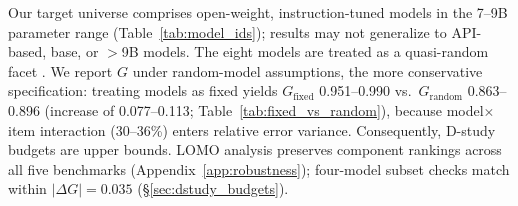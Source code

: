 Our target universe comprises open-weight, instruction-tuned models in the 7--9B parameter range (Table~\ref{tab:model_ids}); results may not generalize to API-based, base, or $>$9B models. The eight models are treated as a quasi-random facet \cite{meredith1993measurement, putnick2016measurement}. We report $G$ under random-model assumptions, the more conservative specification: treating models as fixed yields $G_\text{fixed}$ 0.951--0.990 vs.\ $G_\text{random}$ 0.863--0.896 (increase of 0.077--0.113; Table~\ref{tab:fixed_vs_random}), because model$\times$item interaction (30--36\%) enters relative error variance. Consequently, D-study budgets are upper bounds. LOMO analysis preserves component rankings across all five benchmarks (Appendix~\ref{app:robustness}); four-model subset checks match within $|\Delta G| = 0.035$ (\S\ref{sec:dstudy_budgets}).
\label{sec:model_facet}
